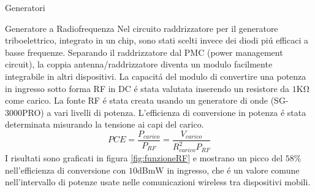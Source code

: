 \begin{section}{Generatori}
\begin{subsection}{Generatore a Radiofrequenza}
        Nel circuito raddrizzatore per il generatore triboelettrico, integrato in un chip, sono stati scelti invece dei diodi pi\'u efficaci a basse frequenze. Separando il raddrizzatore dal PMC (power management circuit), la coppia antenna/raddrizzatore diventa un modulo facilmente integrabile in altri dispositivi. La capacit\'a del modulo di convertire una potenza in ingresso sotto forma RF in DC \'e stata valutata inserendo un resistore da \(1\mathrm{K\Omega}\) come carico. La fonte RF \'e stata creata usando un generatore di onde (SG-3000PRO) a vari livelli di potenza. L'efficienza di conversione in potenza \'e stata determinata misurando la tensione ai capi del carico.
        \begin{equation*}
            PCE = \frac{P_{carico}}{P_{RF}} = \frac{V_{carico}}{R_{carico}^2P_{RF}}
        \end{equation*}
        I risultati sono graficati in figura \ref{fig:funzioneRF} e mostrano un picco del \(58\%\) nell'efficienza di conversione con \(10\mathrm{dBmW}\) in ingresso, che \'e un valore comune nell'intervallo di potenze usate nelle comunicazioni wireless tra dispositivi mobili. 
    \end{subsection}
\end{section}

